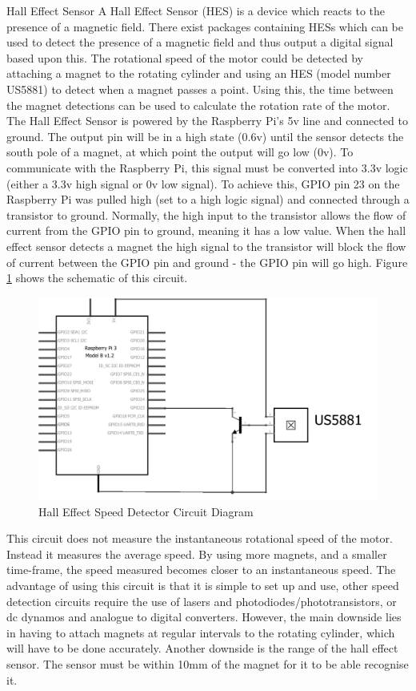 \documentclass[twoside,a4]{report}
\def\br{\newline \newline \noindent}
\begin{document}
\large Hall Effect Sensor \normalsize \br
A Hall Effect Sensor (HES) is a device which reacts to the presence of a magnetic field. There exist packages containing HESs which can be used to detect the presence of a magnetic field and thus output a digital signal based upon this. The rotational speed of the motor could be detected by attaching a magnet to the rotating cylinder and using an HES (model number US5881) to detect when a magnet passes a point. Using this, the time between the magnet detections can be used to calculate the rotation rate of the motor. \br
The Hall Effect Sensor is powered by the Raspberry Pi's 5v line and connected to ground. The output pin will be in a high state (0.6v) until the sensor detects the south pole of a magnet, at which point the output will go low (0v). To communicate with the Raspberry Pi, this signal must be converted into 3.3v logic (either a 3.3v high signal or 0v low signal). To achieve this, GPIO pin 23 on the Raspberry Pi was pulled high (set to a high logic signal) and connected through a transistor to ground. Normally, the high input to the transistor allows the flow of current from the GPIO pin to ground, meaning it has a low value. When the hall effect sensor detects a magnet the high signal to the transistor will block the flow of current between the GPIO pin and ground - the GPIO pin will go high. Figure \ref{circhall} shows the schematic of this circuit. \newline
\begin{figure}[!htb]
	\centering
	\includegraphics[scale=0.3]{images/circspeeddet.png}
	\caption{Hall Effect Speed Detector Circuit Diagram}
	\label{circhall}
\end{figure} \newline  \noindent
This circuit does not measure the instantaneous rotational speed of the motor. Instead it measures the average speed. By using more magnets, and a smaller time-frame, the speed measured becomes closer to an instantaneous speed. The advantage of using this circuit is that it is simple to set up and use, other speed detection circuits require the use of lasers and photodiodes/phototransistors, or dc dynamos and analogue to digital converters. However, the main downside lies in having to attach magnets at regular intervals to the rotating cylinder, which will have to be done accurately. Another downside is the range of the hall effect sensor. The sensor must be within 10mm of the magnet for it to be able recognise it. \newline \newline \noindent
\end{document}
